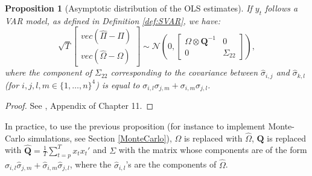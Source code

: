 \documentclass[
  11pt,
]{book}
\newtheorem{proposition}{Proposition}[chapter]
\theoremstyle{definition}
\theoremstyle{definition}
\theoremstyle{definition}
\theoremstyle{definition}
\theoremstyle{remark}
\begin{document}
\begin{proposition}[Asymptotic distribution of the OLS estimates]
\protect\hypertarget{prp:OLSVAR2}{}\label{prp:OLSVAR2}If \(y_t\) follows a VAR model, as defined in Definition \ref{def:SVAR}, we have:
\begin{equation}
\sqrt{T}\left[
\begin{array}{c}
vec(\hat\Pi - \Pi)\\
vec(\hat\Omega - \Omega)
\end{array}
\right]
\sim \mathcal{N}\left(0,
\left[
\begin{array}{cc}
\Omega \otimes \mathbf{Q}^{-1} & 0\\
0 & \Sigma_{22}
\end{array}
\right]\right),\label{eq:asymptPi}
\end{equation}
where the component of \(\Sigma_{22}\) corresponding to the covariance between \(\hat\sigma_{i,j}\) and \(\hat\sigma_{k,l}\) (for \(i,j,l,m \in \{1,\dots,n\}^4\)) is equal to \(\sigma_{i,l}\sigma_{j,m}+\sigma_{i,m}\sigma_{j,l}\).
\end{proposition}

\begin{proof}
See \citet{Hamilton_1994}, Appendix of Chapter 11.
\end{proof}

In practice, to use the previous proposition (for instance to implement Monte-Carlo simulations, see Section \ref{MonteCarlo}), \(\Omega\) is replaced with \(\hat{\Omega}\), \(\mathbf{Q}\) is replaced with \(\hat{\mathbf{Q}} = \frac{1}{T}\sum_{t=p}^T x_t x_t'\) and \(\Sigma\) with the matrix whose components are of the form \(\hat\sigma_{i,l}\hat\sigma_{j,m}+\hat\sigma_{i,m}\hat\sigma_{j,l}\), where the \(\hat\sigma_{i,l}\)'s are the components of \(\hat\Omega\).
\end{document}
